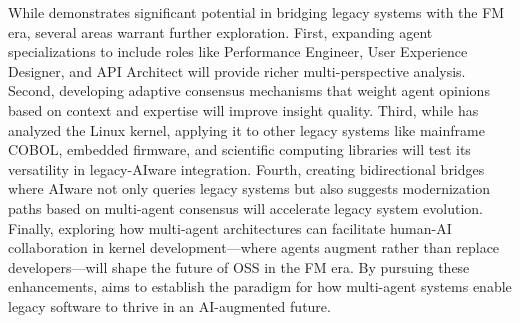 While \sys demonstrates significant potential in bridging legacy systems with the FM era, several areas warrant further exploration. First, expanding agent specializations to include roles like Performance Engineer, User Experience Designer, and API Architect will provide richer multi-perspective analysis. Second, developing adaptive consensus mechanisms that weight agent opinions based on context and expertise will improve insight quality. Third, while \sys has analyzed the Linux kernel, applying it to other legacy systems like mainframe COBOL, embedded firmware, and scientific computing libraries will test its versatility in legacy-AIware integration. Fourth, creating bidirectional bridges where AIware not only queries legacy systems but also suggests modernization paths based on multi-agent consensus will accelerate legacy system evolution. Finally, exploring how multi-agent architectures can facilitate human-AI collaboration in kernel development—where agents augment rather than replace developers—will shape the future of OSS in the FM era. By pursuing these enhancements, \sys aims to establish the paradigm for how multi-agent systems enable legacy software to thrive in an AI-augmented future.

% 
% 